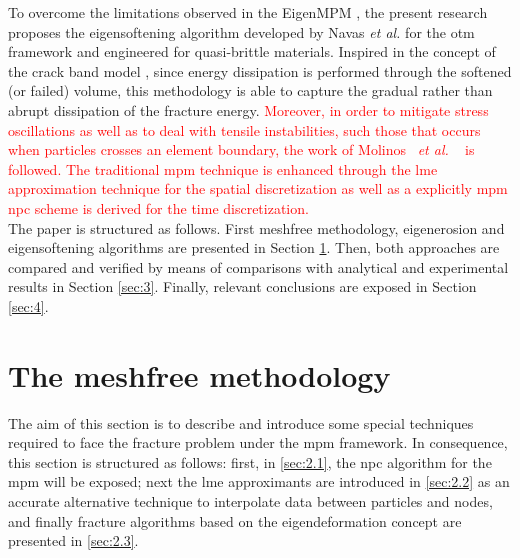 \documentclass[preprint,12pt,a4paper]{elsarticle}
\newcommand{\etal}{
  \textit{et al.}
}
\newcommand{\PNA}[1]{
  \textcolor{red}{{#1}}
}
\begin{document}
To overcome the limitations observed in the EigenMPM
\cite{Zhang_EE_2020}, the present research proposes the eigensoftening
algorithm developed by Navas {\it et al.}
\cite{Navas_2017_ES,Navas2018a} for the \acrshort{otm} framework and
engineered for quasi-brittle materials. Inspired in the concept of the
crack band model \cite{Bazant83}, since energy dissipation is performed through the softened (or failed) volume, this methodology is able to capture the gradual rather than abrupt
dissipation of the fracture energy. \PNA{Moreover, in order to mitigate stress
oscillations as well as to deal with tensile instabilities, such those that
occurs when particles crosses an element boundary, the work of Molinos~\etal~\cite{Molinos2020} is followed. The traditional \acrshort{mpm} technique is enhanced through the \acrfull{lme} approximation technique
\cite{Arroyo2006} for the spatial discretization as well as a explicitly \acrshort{mpm} \acrfull{npc} scheme is derived for the time discretization.}\\

The paper is structured as follows. First meshfree methodology,
eigenerosion and eigensoftening algorithms are presented in Section
\ref{sec:2}. Then, both approaches are compared and verified by means of
comparisons with analytical and experimental results in Section
\ref{sec:3}. Finally, relevant conclusions are exposed in Section \ref{sec:4}.

\section{The meshfree methodology}
\label{sec:2}

The aim of this section is to describe and introduce some special
techniques required to face the fracture problem under the \acrshort{mpm}
framework. In consequence, this section is structured as follows: first, in
\ref{sec:2.1}, the \acrfull{npc} algorithm for the \acrshort{mpm}
will be exposed; next the \acrshort{lme} approximants are
introduced in \ref{sec:2.2} as an accurate alternative technique to
interpolate data between particles and nodes, and finally fracture
algorithms based on the eigendeformation concept are presented in
\ref{sec:2.3}.
\end{document}
